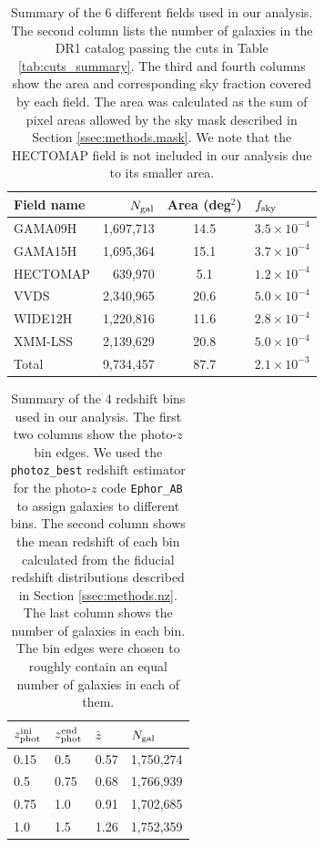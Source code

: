 \documentclass[a4paper,11pt]{article}
\begin{document}
  \begin{table}
  \centering
  \begin{tabular}{|l|r|c|l|}
   \hline
   {\bf Field name} & $N_{\rm gal}$ & {\bf Area} (deg$^2$) & $f_{\rm sky}$ \\
   \hline
   GAMA09H  & 1,697,713 & 14.5 & $3.5\times10^{-4}$ \\
   GAMA15H  & 1,695,364 & 15.1 & $3.7\times10^{-4}$ \\
   HECTOMAP &   639,970 &  5.1 & $1.2\times10^{-4}$ \\
   VVDS     & 2,340,965 & 20.6 & $5.0\times10^{-4}$ \\
   WIDE12H  & 1,220,816 & 11.6 & $2.8\times10^{-4}$ \\
   XMM-LSS   & 2,139,629 & 20.8 & $5.0\times10^{-4}$ \\
   \hline
   Total    & 9,734,457 & 87.7 & $2.1\times10^{-3}$ \\
   \hline
  \end{tabular}
  \caption{Summary of the 6 different fields used in our analysis. The second column lists the number of galaxies in the DR1 catalog passing the cuts in Table \ref{tab:cuts_summary}. The third and fourth columns show the area and corresponding sky fraction covered by each field. The area was calculated as the sum of pixel areas allowed by the sky mask described in Section \ref{ssec:methods.mask}. We note that the HECTOMAP field is not included in our analysis due to its smaller area.} \label{tab:field_summary}
  \end{table}  

  \begin{table}
  \centering
  \begin{tabular}{|l|l|l|l|}
    \hline
    $z_{\rm phot}^{\rm ini}$ & $z_{\rm phot}^{\rm end}$ & $\bar{z}$ & $N_{\rm gal}$ \\
    \hline
    0.15 & 0.5  & 0.57 & 1,750,274 \\
    0.5  & 0.75 & 0.68 & 1,766,939 \\
    0.75 & 1.0  & 0.91 & 1,702,685 \\
    1.0  & 1.5  & 1.26 & 1,752,359 \\
    \hline
  \end{tabular}
  \caption{Summary of the 4 redshift bins used in our analysis. The first two columns show the photo-$z$ bin edges. We used the {\tt photoz\_best} redshift estimator for the photo-$z$ code {\tt Ephor\_AB} to assign galaxies to different bins. The second column shows the mean redshift of each bin calculated from the fiducial redshift distributions described in Section \ref{ssec:methods.nz}. The last column shows the number of galaxies in each bin. The bin edges were chosen to roughly contain an equal number of galaxies in each of them.} \label{tab:bins_summary}
  \end{table}
  
\end{document}
